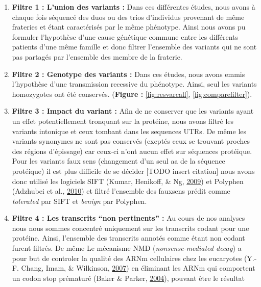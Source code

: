 \documentclass[12pt,twoside]{reedthesis}
\providecommand{\tightlist}{%
  \setlength{\itemsep}{0pt}\setlength{\parskip}{0pt}}
\theoremstyle{definition}
\theoremstyle{definition}
\theoremstyle{remark}
\begin{document}
  \begin{enumerate}
  \def\labelenumi{\arabic{enumi}.}
  \tightlist
  \item
    \textbf{Filtre 1 : L'union des variants :} Dans ces différentes
    études, nous avons à chaque fois séquencé des duos ou des trios
    d'individus provenant de même frateries et étant caractérisés par le
    même phénotype. Ainsi nous avons pu formuler l'hypothèse d'une cause
    génétique commune entre les différents patients d'une même famille et
    donc filtrer l'ensemble des variants qui ne sont pas partagés par
    l'ensemble des membre de la fraterie.\\
  \item
    \textbf{Filtre 2 : Genotype des variants :} Dans ces études, nous
    avons emmis l'hypothèse d'une transmission recessive du phénotype.
    Ainsi, seul les variants homozygotes ont été conservés.
    (\textbf{Figure : }\ref{fig:resvarcall}, \ref{fig:comparefilter}).\\
  \item
    \textbf{Filtre 3 : Impact du variant :} Afin de ne conserver que les
    variants ayant un effet potentiellement tronquant sur la protéine,
    nous avons filtré les variants intonique et ceux tombant dans les
    sequences UTRs. De même les variants synonymes ne sont pas conservés
    (exeptés ceux se trouvant proches des régions d'épissage) car ceux-ci
    n'ont aucun effet sur séquences protéique. Pour les variants faux sens
    (changement d'un seul aa de la séquence protéique) il est plus
    difficile de se décider {[}TODO insert citation{]} nous avons donc
    utilisé les logiciels SIFT (Kumar, Henikoff, \& Ng,
    \protect\hyperlink{ref-Kumar2009}{2009}) et Polyphen (Adzhubei et al.,
    \protect\hyperlink{ref-Adzhubei2010}{2010}) et filtré l'ensemble des
    fauxsens prédit comme \emph{tolerated} par SIFT et \emph{benign} par
    Polyphen.\\
  \item
    \textbf{Filtre 4 : Les transcrits ``non pertinents'' :} Au cours de
    nos analyses nous nous sommes concentré uniquement sur les transcrits
    codant pour une protéine. Ainsi, l'ensemble des transcrits annotés
    comme étant non codant furent filtrés. De même Le mécanisme NMD
    (\emph{nonsense-mediated decay}) a pour but de controler la qualité
    des ARNm cellulaires chez les eucaryotes (Y.-F. Chang, Imam, \&
    Wilkinson, \protect\hyperlink{ref-Chang2007}{2007}) en éliminant les
    ARNm qui comportent un codon stop prématuré (Baker \& Parker,
    \protect\hyperlink{ref-Baker2004}{2004}), pouvant être le résultat

\end{enumerate}
\end{document}
